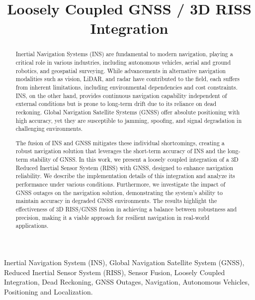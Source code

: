 \documentclass[conference]{IEEEtran}
\begin{document}
\title{Loosely Coupled GNSS / 3D RISS Integration}

\author{
}

\maketitle

\begin{abstract}
Inertial Navigation Systems (INS) are fundamental to modern navigation, playing a critical role in various industries, including autonomous vehicles, aerial and ground robotics, and geospatial surveying. While advancements in alternative navigation modalities such as vision, LiDAR, and radar have contributed to the field, each suffers from inherent limitations, including environmental dependencies and cost constraints. INS, on the other hand, provides continuous navigation capability independent of external conditions but is prone to long-term drift due to its reliance on dead reckoning. Global Navigation Satellite Systems (GNSS) offer absolute positioning with high accuracy, yet they are susceptible to jamming, spoofing, and signal degradation in challenging environments.

The fusion of INS and GNSS mitigates these individual shortcomings, creating a robust navigation solution that leverages the short-term accuracy of INS and the long-term stability of GNSS. In this work, we present a loosely coupled integration of a 3D Reduced Inertial Sensor System (RISS) with GNSS, designed to enhance navigation reliability. We describe the implementation details of this integration and analyze its performance under various conditions. Furthermore, we investigate the impact of GNSS outages on the navigation solution, demonstrating the system's ability to maintain accuracy in degraded GNSS environments. The results highlight the effectiveness of 3D RISS/GNSS fusion in achieving a balance between robustness and precision, making it a viable approach for resilient navigation in real-world applications.
\end{abstract}

\begin{IEEEkeywords}
Inertial Navigation System (INS), Global Navigation Satellite System (GNSS), Reduced Inertial Sensor System (RISS), Sensor Fusion, Loosely Coupled Integration, Dead Reckoning, GNSS Outages, Navigation, Autonomous Vehicles, Positioning and Localization.
\end{IEEEkeywords}
\end{document}
